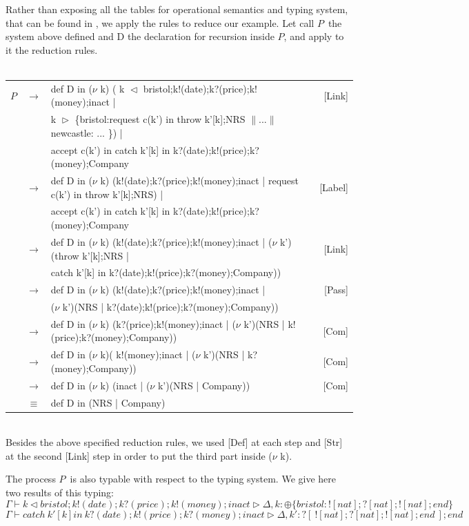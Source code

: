 \documentclass[a4paper,11pt,twoside]{report}
\newcommand{\PP}{\ensuremath{P}}
\newcommand{\Ga}{\ensuremath{\Gamma}}
\newcommand{\D}{\ensuremath{\Delta}}
\newcommand{\der}[3]{\ensuremath{#1\vdash#2\triangleright#3}}
\begin{document}
Rather than exposing all the tables for operational semantics and typing system, that can be found in \cite{honda1998language,yoshida2007language}, we apply the rules to reduce our example. Let call \PP ~the system above defined and D the declaration for recursion inside \PP, and apply to it the reduction rules.\\
~~\\
\begin{tabular}{lclr}
\PP& $\rightarrow$ &def D in ($\nu$ k) ( k $\vartriangleleft$ bristol;k!(date);k?(price);k!(money);inact | & [Link]\\
&& k $\vartriangleright$ \{bristol:request c(k') in throw k'[k];NRS $\| ...\|$ newcastle: ... \}) |&  \\
&&accept c(k') in catch k'[k] in k?(date);k!(price);k?(money);Company&  \\
& $\rightarrow$  & def D in ($\nu$ k) (k!(date);k?(price);k!(money);inact | request c(k') in throw k'[k];NRS) |&[Label]\\
&&accept c(k') in catch k'[k] in k?(date);k!(price);k?(money);Company&\\
& $\rightarrow$  & def D in ($\nu$ k) (k!(date);k?(price);k!(money);inact | ($\nu$ k')(throw k'[k];NRS |& [Link]\\
&&catch k'[k] in k?(date);k!(price);k?(money);Company))&\\
& $\rightarrow$  & def D in ($\nu$ k) (k!(date);k?(price);k!(money);inact | & [Pass]\\
&& ($\nu$ k')(NRS |  k?(date);k!(price);k?(money);Company))&\\
& $\rightarrow$  & def D in ($\nu$ k) (k?(price);k!(money);inact |  ($\nu$ k')(NRS | k!(price);k?(money);Company))& [Com]\\
& $\rightarrow$  & def D in ($\nu$ k)( k!(money);inact | ($\nu$ k')(NRS |  k?(money);Company))&[Com]\\
& $\rightarrow$  & def D in ($\nu$ k) (inact |  ($\nu$ k')(NRS | Company))& [Com]\\
& $\equiv$  & def D in (NRS | Company) & \\
\end{tabular}
~ ~\\
Besides the above specified reduction rules, we used [Def] at each step and [Str] at the second [Link] step in order to put the third part inside ($\nu$ k).

The process \PP~is also typable with respect to the typing system. We give here two results of this typing:
\[ \der \Ga { k \vartriangleleft bristol;k!(date);k?(price);k!(money);inact}\D,k:\oplus \{ bristol:![nat];?[nat];![nat];end\}\]
\[ \der \Ga {catch~ k'[k] in~ k?(date);k!(price);k?(money);inact}\D,k':?[~ ![nat];?[nat];![nat];end~ ];end\]
\end{document}
